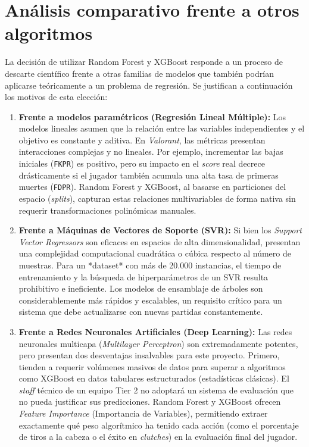 \documentclass{ULBreport} %
\begin{document}
\section{Análisis comparativo frente a otros algoritmos}

La decisión de utilizar Random Forest y XGBoost responde a un proceso de descarte científico frente a otras familias de modelos que también podrían aplicarse teóricamente a un problema de regresión. Se justifican a continuación los motivos de esta elección:

\begin{enumerate}
    \item \textbf{Frente a modelos paramétricos (Regresión Lineal Múltiple):}
    Los modelos lineales asumen que la relación entre las variables independientes y el objetivo es constante y aditiva. En \textit{Valorant}, las métricas presentan interacciones complejas y no lineales. Por ejemplo, incrementar las bajas iniciales (\texttt{FKPR}) es positivo, pero su impacto en el \textit{score} real decrece drásticamente si el jugador también acumula una alta tasa de primeras muertes (\texttt{FDPR}). Random Forest y XGBoost, al basarse en particiones del espacio (\textit{splits}), capturan estas relaciones multivariables de forma nativa sin requerir transformaciones polinómicas manuales.

    \item \textbf{Frente a Máquinas de Vectores de Soporte (SVR):}
    Si bien los \textit{Support Vector Regressors} son eficaces en espacios de alta dimensionalidad, presentan una complejidad computacional cuadrática o cúbica respecto al número de muestras. Para un *dataset* con más de 20.000 instancias, el tiempo de entrenamiento y la búsqueda de hiperparámetros de un SVR resulta prohibitivo e ineficiente. Los modelos de ensamblaje de árboles son considerablemente más rápidos y escalables, un requisito crítico para un sistema que debe actualizarse con nuevas partidas constantemente.

    \item \textbf{Frente a Redes Neuronales Artificiales (Deep Learning):}
    Las redes neuronales multicapa (\textit{Multilayer Perceptron}) son extremadamente potentes, pero presentan dos desventajas insalvables para este proyecto. Primero, tienden a requerir volúmenes masivos de datos para superar a algoritmos como XGBoost en datos tabulares estructurados (estadísticas clásicas). El \textit{staff} técnico de un equipo Tier 2 no adoptará un sistema de evaluación que no pueda justificar sus predicciones. Random Forest y XGBoost ofrecen \textit{Feature Importance} (Importancia de Variables), permitiendo extraer exactamente qué peso algorítmico ha tenido cada acción (como el porcentaje de tiros a la cabeza o el éxito en \textit{clutches}) en la evaluación final del jugador.
    

\end{enumerate}
\end{document}
